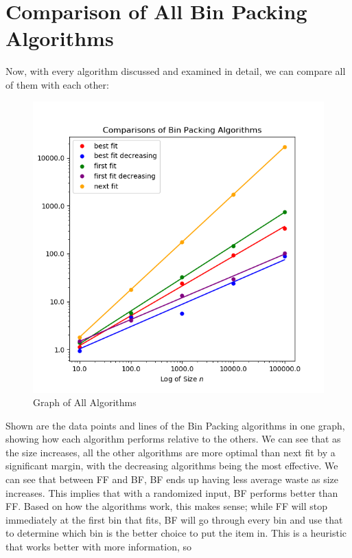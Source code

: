 \documentclass{article}
\begin{document}
\section{Comparison of All Bin Packing Algorithms}
    Now, with every algorithm discussed and examined in detail, we can compare
    all of them with each other:
    \begin{figure}[H]
        \centering
        \includegraphics[scale=0.60]{"../images/qualities"}
        \caption{Graph of All Algorithms}
    \end{figure}
    \noindent Shown are the data points and lines of the Bin Packing algorithms 
    in one graph, showing how each algorithm performs relative to the others. 
    We can see that as the size increases, all the other algorithms are 
    more optimal than next fit by a significant margin, with the decreasing
    algorithms being the most effective. 
    \nextblurb
    We can see that between FF and BF, BF ends up having less average waste as 
    size increases. This implies that with a randomized input, BF performs 
    better than FF. Based on how the algorithms work, this makes sense; while
    FF will stop immediately at the first bin that fits, BF will go through
    every bin and use that to determine which bin is the better choice to put
    the item in. This is a heuristic that works better with more information, so
\end{document}
